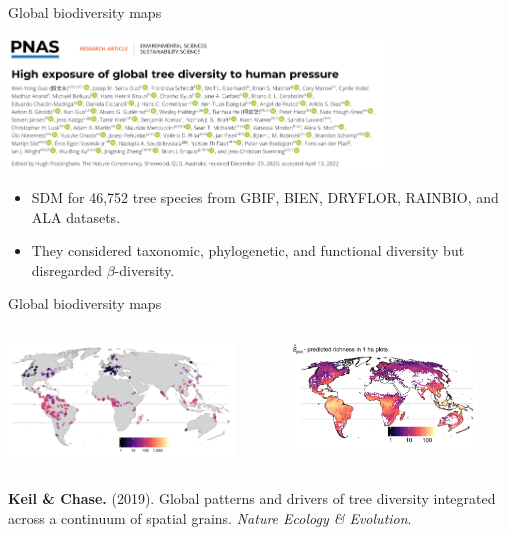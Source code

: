 \documentclass[10pt,table,dvipsnames,compress]{beamer}
\begin{document}
\begin{frame}[label={sec:org7192784}]{Global biodiversity maps}
\begin{center}
\includegraphics[width=10cm]{figs/biodiv/Guo2022-title.png}
\end{center}

\begin{itemize}
\item SDM for 46,752 tree species from GBIF, BIEN, DRYFLOR, RAINBIO, and ALA datasets.
\item They considered taxonomic, phylogenetic, and functional diversity but disregarded \(\beta\)-diversity.
\end{itemize}
\end{frame}

\begin{frame}[label={sec:orgeb064af}]{Global biodiversity maps}
\begin{columns}
\begin{column}{0.5\columnwidth}
\begin{center}
\includegraphics[width=6cm]{figs/biodiv/Keil2019-figure.png}
\end{center}
\end{column}

\begin{column}{0.5\columnwidth}
\begin{center}
\includegraphics[width=5cm]{figs/biodiv/Keil2019-figure-2.png}
\end{center}
\end{column}
\end{columns}

\begin{block}{}
\textbf{Keil \& Chase.} (2019). Global patterns and drivers of tree diversity integrated across a continuum of spatial grains. \emph{Nature Ecology \& Evolution}.
\end{block}
\end{frame}
\end{document}
